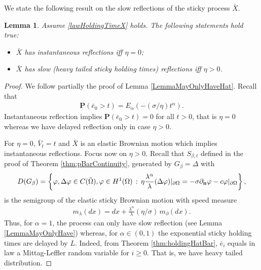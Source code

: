 \documentclass[11pt,a4paper]{article}
\newtheorem{lemma}{Lemma}
\begin{document}
We state the following result on the slow reflections of the sticky process $\bar{X}$.

\begin{lemma}
\label{LemmaMayOnlyHaveBar}
Assume \eqref{lawHoldingTimeX} holds. The following statements hold true:
\begin{itemize} 
\item[i)] $\bar{X}$ has instantaneous reflections iff $\eta=0$;
\item[ii)] $\bar{X}$ has slow (heavy tailed sticky holding times) reflections iff $\eta>0$.
\end{itemize}
\end{lemma}
\begin{proof}
We follow partially the proof of Lemma \ref{LemmaMayOnlyHaveHat}. Recall that  
\begin{align*}
\mathbf{P}(\bar{e}_0 >t) = E_\alpha(-(\sigma/\eta) t^\alpha).
\end{align*}
Instantaneous reflection implies $\mathbf{P}(\bar{e}_0 >t)=0$ for all $t>0$, that is $\eta=0$ whereas we have delayed reflection only in case $\eta>0$.

For $\eta=0$, $\bar{V}_t = t$ and $\bar{X}$ is an elastic Brownian motion which implies instantaneous reflections. Focus now on $\eta>0$. Recall that $S_{\beta, t}$ defined in the proof of Theorem \ref{thm:pBarContinuity}, generated by $G_\beta = \Delta$ with
\begin{align*}
D(G_\beta) = \left\{ \varphi, \Delta \varphi \in C(\bar{\Omega}), \varphi \in H^1(\Omega)\,:\, \eta \frac{\lambda^\alpha}{\lambda} (\Delta \varphi) |_{\partial \Omega} = - \sigma \partial_{\bf n} \varphi - c \varphi |_{\partial \Omega} \right\},
\end{align*}
is the semigroup of the elastic sticky Brownian motion with speed measure
\begin{align*}
m_\lambda(dx) = dx + \frac{\lambda^\alpha}{\lambda} (\eta/\sigma) \, m_\partial (dx).
\end{align*}
Thus, for $\alpha=1$, the process can only have slow reflection (see Lemma \ref{LemmaMayOnlyHave}) whereas, for $\alpha \in (0,1)$ the exponential sticky holding times are delayed by $L$. Indeed, from Theorem \ref{thm:holdingHatBar}, $\bar{e}_i$ equals in law a Mittag-Leffler random variable for $i\geq 0$. That is, we have heavy tailed distribution. 

\end{proof}
\end{document}
